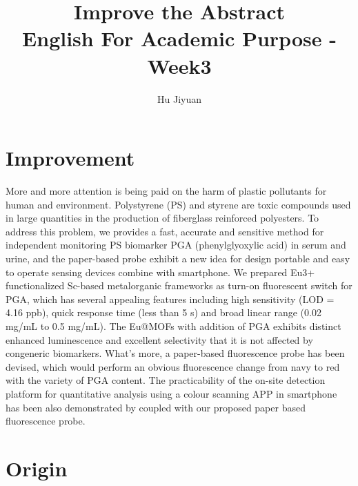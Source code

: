 \documentclass{article}
\title{Improve the Abstract\\English For Academic Purpose - Week3}
\author{Hu Jiyuan}
\begin{document}
\maketitle

\section{Improvement}

More and more attention is being paid on the harm of plastic pollutants for 
human and environment.
Polystyrene (PS) and styrene are toxic compounds used in large quantities in 
the production of fiberglass reinforced polyesters. 
To address this problem, we provides a fast, accurate and sensitive method for 
independent monitoring PS biomarker PGA (phenylglyoxylic acid) in serum and 
urine, and the paper-based probe exhibit a new idea for design portable and 
easy to operate sensing devices combine with smartphone.
We prepared Eu3+ functionalized Sc-based metalorganic frameworks as turn-on 
fluorescent switch for PGA, which has several appealing features including high 
sensitivity (LOD = 4.16 ppb), quick response time (less than 5 s) and broad 
linear range (0.02 mg/mL to 0.5 mg/mL). 
The Eu@MOFs with addition of PGA exhibits distinct enhanced luminescence and 
excellent selectivity that it is not affected by congeneric biomarkers. 
What's more, a paper-based fluorescence probe has been devised, which would 
perform an obvious fluorescence change from navy to red with the variety of PGA 
content.
The practicability of the on-site detection platform for quantitative analysis 
using a colour scanning APP in smartphone has been also demonstrated by coupled 
with our proposed paper based fluorescence probe. 

\section{Origin}
\end{document}
